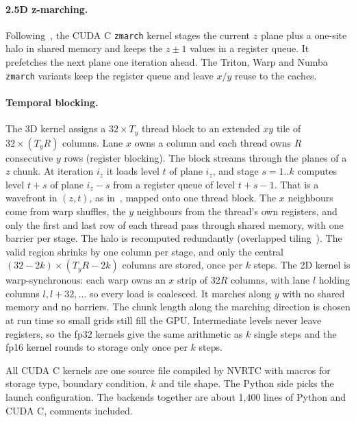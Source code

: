 \documentclass[11pt]{article}
\newcommand{\code}[1]{\texttt{#1}}
\begin{document}
\paragraph{2.5D z-marching.}
Following~\cite{micikevicius2009fd}, the CUDA C \code{zmarch} kernel stages the current $z$
plane plus a one-site halo in shared memory and keeps the $z\pm1$ values in a register queue.
It prefetches the next plane one iteration ahead. The Triton, Warp and Numba \code{zmarch}
variants keep the register queue and leave $x/y$ reuse to the caches.

\paragraph{Temporal blocking.}
\label{sec:tb}
The 3D kernel assigns a $32\times T_y$ thread block to an extended $xy$ tile of
$32\times(T_yR)$ columns. Lane $x$ owns a column and each thread owns $R$ consecutive $y$ rows
(register blocking). The block streams through the planes of a $z$ chunk. At iteration $i_z$ it
loads level $t$ of plane $i_z$, and stage $s=1..k$ computes level $t+s$ of plane $i_z-s$ from a
register queue of level $t+s-1$. That is a wavefront in $(z,t)$, as in~\cite{wellein2009temporal},
mapped onto one thread block. The $x$ neighbours come from warp shuffles, the $y$ neighbours
from the thread's own registers, and only the first and last row of each thread pass through
shared memory, with one barrier per stage. The halo is recomputed redundantly (overlapped
tiling~\cite{holewinski2012stencil}). The valid region shrinks by one column per stage, and
only the central $(32-2k)\times(T_yR-2k)$ columns are stored, once per $k$ steps. The 2D kernel
is warp-synchronous: each warp owns an $x$ strip of $32R$ columns, with lane $l$ holding columns
$l, l+32, \dots$ so every load is coalesced. It marches along $y$ with no shared memory and no
barriers. The chunk length along the marching direction is chosen at run time so small grids
still fill the GPU. Intermediate levels never leave registers, so the fp32 kernels give the
same arithmetic as $k$ single steps and the fp16 kernel rounds to storage only once per $k$
steps.

All CUDA C kernels are one source file compiled by NVRTC with macros for storage type,
boundary condition, $k$ and tile shape. The Python side picks the launch configuration. The
backends together are about 1{,}400 lines of Python and CUDA C, comments included.
\end{document}
